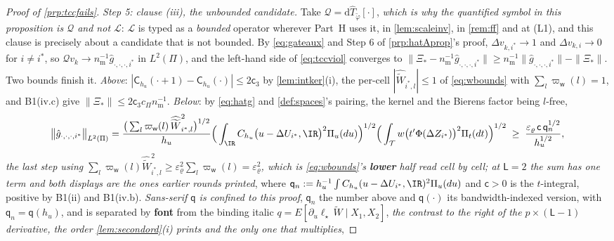 \begin{proof}[Proof of \cref{prp:tccfails}]
\emph{Step 5: clause (iii), the unbounded candidate.} Take
$\mathcal Q=\mathrm d\hat T_{\tilde\varphi}[\cdot]$, \emph{which is why the quantified symbol in this
proposition is $\mathcal Q$ and not $\mathcal L$}: $\mathcal L$ is typed as a \emph{bounded} operator
wherever Part~H uses it, in \cref{lem:scaleinv}, in \cref{rem:ff} and at (L1), and this clause is
precisely about a candidate that is not bounded. By \eqref{eq:gateaux} and Step 6 of
\cref{prp:hatAprop}'s proof, $\Delta v_{k,i^\ast}\to1$ and $\Delta v_{k,i}\to0$ for $i\ne i^\ast$, so
$\mathcal Qv_k\to n_{\mathrm m}^{-1}\hat g_{\cdot,\cdot,\cdot,i^\ast}$ in $L^{2}(\Pi)$, and the left-hand side
of \eqref{eq:tccviol} converges to
$\|\Xi_\ast-n_{\mathrm m}^{-1}\hat g_{\cdot,\cdot,\cdot,i^\ast}\|
\ge n_{\mathrm m}^{-1}\|\hat g_{\cdot,\cdot,\cdot,i^\ast}\|-\|\Xi_\ast\|$.
Two bounds finish it. \emph{Above}: $|\mathsf C_{h_u}(\cdot+1)-\mathsf C_{h_u}(\cdot)|\le2\mathsf c_3$
by \cref{lem:intker}(i), the per-cell $|\widehat{\widetilde W}_{i^\ast,l}|\le1$ of \eqref{eq:wbounds}
with $\sum_l\varpi_{\mathsf w}(l)=1$, and B1(iv.c) give
$\|\Xi_\ast\|\le2\mathsf c_3c_\Pi n_{\mathrm m}^{-1}$. \emph{Below}: by \eqref{eq:hatg} and
\cref{def:spaces}'s pairing, the kernel and the Bierens factor being $l$-free,
\[
\big\|\hat g_{\cdot,\cdot,\cdot,i^\ast}\big\|_{L^{2}(\Pi)}
=\frac{\big(\sum_{l}\varpi_{\mathsf w}(l)\,\widehat{\widetilde W}_{i^\ast,l}^{2}\big)^{1/2}}{h_u}
\Big(\int_{\IR}C_{h_u}\big(u-\Delta U_{i^\ast},\IR\big)^{2}\Pi_u(du)\Big)^{1/2}
\Big(\int_{\mathcal T}w\big(t'\Phi(\Delta Z_{i^\ast})\big)^{2}\Pi_t(dt)\Big)^{1/2}
\;\ge\;\frac{\varepsilon_\varrho\,\mathsf c\,\mathsf q_n^{1/2}}{h_u^{1/2}} ,
\]
\emph{the last step using $\sum_l\varpi_{\mathsf w}(l)\widehat{\widetilde W}_{i^\ast,l}^{2}
\ge\varepsilon_\varrho^{2}\sum_l\varpi_{\mathsf w}(l)=\varepsilon_\varrho^{2}$, which is
\eqref{eq:wbounds}'s \textbf{lower} half read cell by cell; at $\mathsf L=2$ the sum has one term and
both displays are the ones earlier rounds printed},
where $\mathsf q_n:=h_u^{-1}\int C_{h_u}(u-\Delta U_{i^\ast},\IR)^{2}\Pi_u(du)$ and $\mathsf c>0$ is the
$t$-integral, positive by B1(ii) and B1(iv.b). \emph{Sans-serif $\mathsf q$ is confined to this proof}, 
$\mathsf q_n$ the number above and $\mathsf q(\cdot)$ its bandwidth-indexed
version, with $\mathsf q_n=\mathsf q(h_u)$, and is separated by
\textbf{font} from the binding italic $q=E[\partial_u\ell_\star\,\widetilde W\mid X_1,X_2]$, 
\emph{the contrast to the right of the $p\times(\mathsf L-1)$ derivative, the order
\cref{lem:secondord}\textup{(i)} prints and the only one that multiplies}, 

\end{proof}
